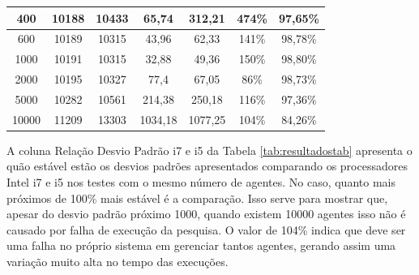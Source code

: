 \documentclass[conference]{IEEEtran}
\begin{document}
\begin{table}[ht]
\begin{tabular}{|c|c|c|c|c|c|c|}
400                                 & 10188                                    & 10433                                    & 65,74                                 & 312,21                                & 474\%                                              & 97,65\%                                          \\ \hline
600                                 & 10189                                    & 10315                                    & 43,96                                 & 62,33                                 & 141\%                                              & 98,78\%                                          \\ \hline
1000                                & 10191                                    & 10315                                    & 32,88                                 & 49,36                                 & 150\%                                              & 98,80\%                                          \\ \hline
2000                                & 10195                                    & 10327                                    & 77,4                                  & 67,05                                 & 86\%                                               & 98,73\%                                          \\ \hline
5000                                & 10282                                    & 10561                                    & 214,38                                & 250,18                                & 116\%                                              & 97,36\%                                          \\ \hline
10000                               & 11209                                    & 13303                                    & 1034,18                               & 1077,25                               & 104\%                                              & 84,26\%                                          \\ \hline
\end{tabular}
\end{table}        
        
        A coluna Relação Desvio Padrão i7 e i5 da Tabela \ref{tab:resultadostab} apresenta o quão estável estão os desvios padrões apresentados comparando os processadores Intel i7 e i5 nos testes com o mesmo número de agentes. No caso, quanto mais próximos de 100\% mais estável é a comparação. Isso serve para mostrar que, apesar do desvio padrão próximo 1000, quando existem 10000 agentes isso não é causado por falha de execução da pesquisa. O valor de 104\% indica que deve ser uma falha no próprio sistema em gerenciar tantos agentes, gerando assim uma variação muito alta no tempo das execuções.
        
\end{document}

